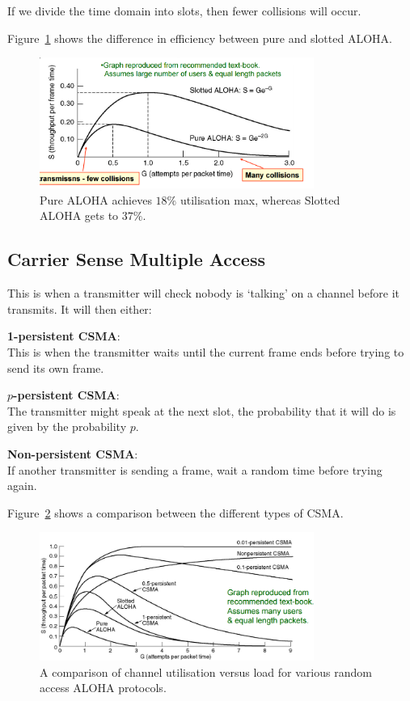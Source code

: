 If we divide the time domain into slots, then fewer collisions will occur.


Figure~\ref{aloha-comp} shows the difference in efficiency between pure and
slotted ALOHA.

\begin{figure}
  \centering
  \includegraphics[width=0.8\textwidth]{images/aloha-comp}
  \caption{Pure ALOHA achieves $18\%$ utilisation max, whereas Slotted ALOHA
  \label{aloha-comp}
  gets to $37\%$.}
\end{figure}

\subsection{Carrier Sense Multiple Access}

This is when a transmitter will check nobody is `talking' on a channel before it
transmits. It will then either:

\begin{description}
  \item \textbf{1-persistent CSMA}:\\
    This is when the transmitter waits until the current frame ends before
    trying to send its own frame.
  \item \textbf{$p$-persistent CSMA}:\\
    The transmitter might speak at the next slot, the probability that it will
    do is given by the probability $p$.
  \item \textbf{Non-persistent CSMA}:\\
    If another transmitter is sending a frame, wait a random time before trying
    again.
\end{description}

Figure~\ref{aloha-rates} shows a comparison between the different types of CSMA.

\begin{figure}
  \centering
  \includegraphics[width=0.8\textwidth]{images/aloha-rates}
  \caption{A comparison of channel utilisation versus load for various random
  access ALOHA protocols.}
  \label{aloha-rates}
\end{figure}

